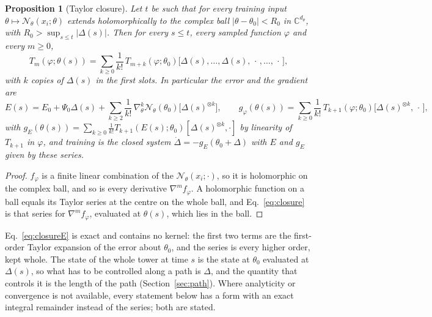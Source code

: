 \documentclass[11pt]{article}
\newtheorem{proposition}{Proposition}
\theoremstyle{definition}
\theoremstyle{remark}
\newcommand{\Net}{\mathcal{N}_\theta}    %
\begin{document}
\begin{proposition}[Taylor closure]\label{prop:closure}
Let $t$ be such that for every training input $\theta\mapsto\Net(x_i;\theta)$ extends holomorphically to the complex ball $|\theta - \theta_0| < R_0$ in $\mathbb{C}^{d_\theta}$, with $R_0 > \sup_{s\le t}|\Delta(s)|$.
Then for every $s\le t$, every sampled function $\varphi$ and every $m\ge0$,
\begin{equation}\label{eq:closure}
T_m(\varphi;\theta(s)) = \sum_{k\ge0}\frac{1}{k!}\,T_{m+k}(\varphi;\theta_0)\big[\Delta(s),\dots,\Delta(s),\,\cdot\,,\dots,\,\cdot\,\big],
\end{equation}
with $k$ copies of $\Delta(s)$ in the first slots.
In particular the error and the gradient are
\begin{equation}\label{eq:closureE}
E(s) = E_0 + \Psi_0\Delta(s) + \sum_{k\ge2}\frac{1}{k!}\,\nabla^k_\theta\Net(\theta_0)\big[\Delta(s)^{\otimes k}\big],\qquad
g_\varphi(\theta(s)) = \sum_{k\ge0}\frac{1}{k!}\,T_{k+1}(\varphi;\theta_0)\big[\Delta(s)^{\otimes k},\,\cdot\,\big],
\end{equation}
with $g_E(\theta(s)) = \sum_{k\ge0}\frac{1}{k!}T_{k+1}(E(s);\theta_0)[\Delta(s)^{\otimes k},\cdot]$ by linearity of $T_{k+1}$ in $\varphi$, and training is the closed system $\dot\Delta = -g_E(\theta_0 + \Delta)$ with $E$ and $g_E$ given by these series.
\end{proposition}

\begin{proof}
$f_\varphi$ is a finite linear combination of the $\Net(x_i;\cdot)$, so it is holomorphic on the complex ball, and so is every derivative $\nabla^mf_\varphi$.
A holomorphic function on a ball equals its Taylor series at the centre on the whole ball, and Eq.~\eqref{eq:closure} is that series for $\nabla^mf_\varphi$, evaluated at $\theta(s)$, which lies in the ball.
\end{proof}

Eq.~\eqref{eq:closureE} is exact and contains no kernel: the first two terms are the first-order Taylor expansion of the error about $\theta_0$, and the series is every higher order, kept whole.
The state of the whole tower at time $s$ is the state at $\theta_0$ evaluated at $\Delta(s)$, so what has to be controlled along a path is $\Delta$, and the quantity that controls it is the length of the path (Section~\ref{sec:path}).
Where analyticity or convergence is not available, every statement below has a form with an exact integral remainder instead of the series; both are stated.
\end{document}
